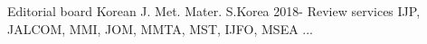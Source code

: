 

\begin{cvhonors}

  \cvhonor
    {Editorial board}
    {Korean J. Met. Mater.}
    {S.Korea} %
    {2018-} %
    \cvhonor
    {Review services}
    {IJP, JALCOM, MMI, JOM, MMTA, MST, IJFO, MSEA ...}
    {}
    {} %
\end{cvhonors}
